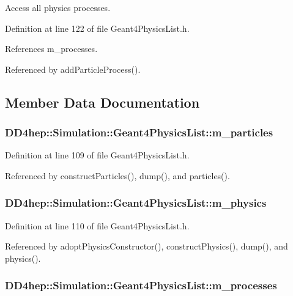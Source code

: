Access all physics processes. 

Definition at line 122 of file Geant4PhysicsList.h.

References m\_\-processes.

Referenced by addParticleProcess().

\subsection{Member Data Documentation}
\hypertarget{class_d_d4hep_1_1_simulation_1_1_geant4_physics_list_afb427bf428aa0c62f79717a598f60de7}{
\subsubsection[{m\_\-particles}]{ {\bf DD4hep::Simulation::Geant4PhysicsList::m\_\-particles}}}
\label{class_d_d4hep_1_1_simulation_1_1_geant4_physics_list_afb427bf428aa0c62f79717a598f60de7}


Definition at line 109 of file Geant4PhysicsList.h.

Referenced by constructParticles(), dump(), and particles().\hypertarget{class_d_d4hep_1_1_simulation_1_1_geant4_physics_list_a7b5de6ccab6cd1083de316546cdba96e}{
\subsubsection[{m\_\-physics}]{ {\bf DD4hep::Simulation::Geant4PhysicsList::m\_\-physics}}}
\label{class_d_d4hep_1_1_simulation_1_1_geant4_physics_list_a7b5de6ccab6cd1083de316546cdba96e}


Definition at line 110 of file Geant4PhysicsList.h.

Referenced by adoptPhysicsConstructor(), constructPhysics(), dump(), and physics().\hypertarget{class_d_d4hep_1_1_simulation_1_1_geant4_physics_list_af3a8295fc76fdab16b92a9cff9b07b56}{
\subsubsection[{m\_\-processes}]{ {\bf DD4hep::Simulation::Geant4PhysicsList::m\_\-processes}}}
\label{class_d_d4hep_1_1_simulation_1_1_geant4_physics_list_af3a8295fc76fdab16b92a9cff9b07b56}



